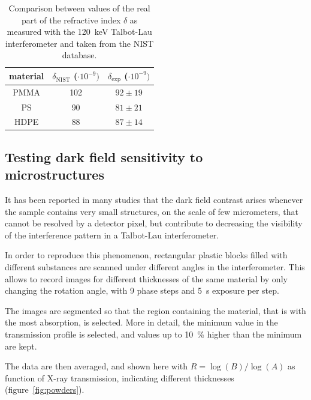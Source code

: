 \begin{table}[htb]
    \centering
    \begin{tabular}{*3c}
        \toprule
        material & $\delta_{\text{NIST}}$ ($\cdot 10^{-9})$ &
        $\delta_{\text{exp}}$ ($\cdot 10^{-9})$ \\
        \midrule
        PMMA & \num{102} & $92 \pm 19$\\
        PS & \num{90} & $81 \pm 21$\\
        HDPE & \num{88} & $87 \pm 14$\\
        \bottomrule
    \end{tabular}
    \caption{Comparison between values of the real part of the refractive
        index $\delta$ as measured with the \SI{120}{\kilo\eV} Talbot-Lau
        interferometer and taken from the NIST database.}
    \label{tab:delta.experiment}
\end{table}

\subsection{Testing dark field sensitivity to microstructures}
It has been reported in many studies that the dark field contrast arises
whenever the sample contains very small structures, on the scale of few
micrometers, that cannot be resolved by a detector pixel, but contribute to
decreasing the visibility of the interference pattern in a Talbot-Lau
interferometer.

In order to reproduce this phenomenon, rectangular plastic blocks filled
with different substances are scanned under different angles in the
interferometer. This allows to record images for different thicknesses of
the same material by only changing the rotation angle, with \num{9} phase
steps and \SI{5}{\second} exposure per step.

The images are segmented so that the region containing the material, that is
with the most absorption, is selected. More in detail, the minimum value in
the transmission profile is selected, and values up to
\SI{10}{\percent} higher than the minimum are kept.

The data are then averaged, and shown here with $R = \log(B) / \log(A)$ as
function of X-ray transmission, indicating different thicknesses
(figure~\ref{fig:powders}).

